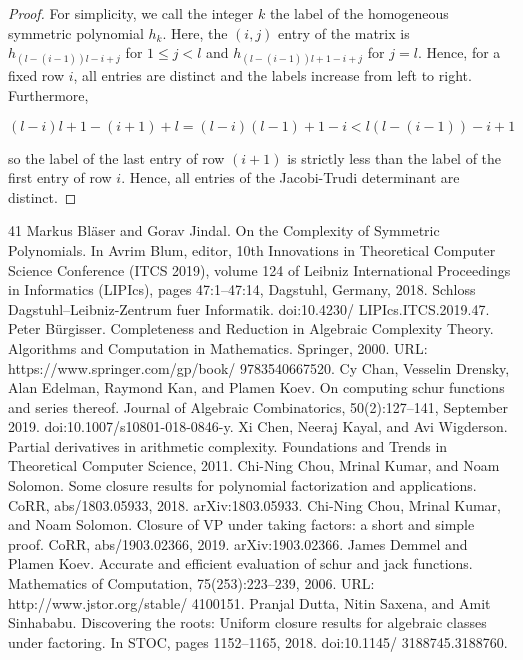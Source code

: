 \documentclass[10pt,a4paper]{article}
\theoremstyle{definition}
\begin{document}
\begin{proof}
For simplicity, we call the integer $k$ the label of the homogeneous symmetric polynomial $h_k$. Here, the $(i,j)$ entry of the matrix is $h_{(l-(i-1))l - i + j}$ for $1 \leq j < l$ and $h_{(l-(i-1))l + 1 - i + j}$ for $j = l$. Hence, for a fixed row $i$, all entries are distinct and the labels increase from left to right. Furthermore,

$$(l-i)l + 1 - (i+1) + l = (l-i)(l-1) + 1 - i < l(l-(i-1)) - i + 1$$

so the label of the last entry of row $(i+1)$ is strictly less than the label of the first entry of row $i$. Hence, all entries of the Jacobi-Trudi determinant are distinct.
\end{proof}

%
%

\begin{thebibliography}{41}
 Markus Bläser and Gorav Jindal. On the Complexity of Symmetric Polynomials. In Avrim Blum, editor, 10th Innovations in Theoretical Computer Science Conference (ITCS 2019), volume 124 of Leibniz International Proceedings in Informatics (LIPIcs), pages 47:1–47:14, Dagstuhl, Germany, 2018. Schloss Dagstuhl–Leibniz-Zentrum fuer Informatik. doi:10.4230/ LIPIcs.ITCS.2019.47.
 Peter Bürgisser. Completeness and Reduction in Algebraic Complexity Theory. Algorithms and Computation in Mathematics. Springer, 2000. URL: https://www.springer.com/gp/book/ 9783540667520.
 Cy Chan, Vesselin Drensky, Alan Edelman, Raymond Kan, and Plamen Koev. On computing schur functions and series thereof. Journal of Algebraic Combinatorics, 50(2):127–141, September 2019. doi:10.1007/s10801-018-0846-y.
 Xi Chen, Neeraj Kayal, and Avi Wigderson. Partial derivatives in arithmetic complexity. Foundations and Trends in Theoretical Computer Science, 2011.
 Chi-Ning Chou, Mrinal Kumar, and Noam Solomon. Some closure results for polynomial factorization and applications. CoRR, abs/1803.05933, 2018. arXiv:1803.05933.
 Chi-Ning Chou, Mrinal Kumar, and Noam Solomon. Closure of VP under taking factors: a short and simple proof. CoRR, abs/1903.02366, 2019. arXiv:1903.02366.
 James Demmel and Plamen Koev. Accurate and efficient evaluation of schur and jack functions. Mathematics of Computation, 75(253):223–239, 2006. URL: http://www.jstor.org/stable/ 4100151.
 Pranjal Dutta, Nitin Saxena, and Amit Sinhababu. Discovering the roots: Uniform closure results for algebraic classes under factoring. In STOC, pages 1152–1165, 2018. doi:10.1145/ 3188745.3188760.

\end{thebibliography}
\end{document}
